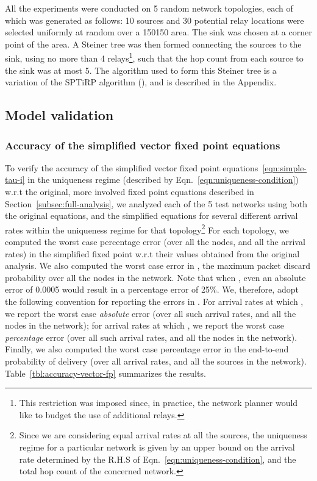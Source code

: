\documentclass[12pt, draftclsnofoot, onecolumn]{IEEEtran}
\begin{document}
All the experiments were conducted on 5 random network topologies, each of which was generated as follows: 10 sources and 30 potential relay locations were selected uniformly at random over a 150150  area. The sink was chosen at a corner point of the area. A Steiner tree was then formed connecting the sources to the sink, using no more than 4 relays\footnote{This restriction was imposed since, in practice, the network planner would like to budget the use of additional relays.}, such that the hop count from each source to the sink was at most 5. The algorithm used to form this Steiner tree is a variation of the SPTiRP algorithm (\cite{fullpaper}), and is described in the Appendix. 

\subsection{Model validation}
\subsubsection{Accuracy of the simplified vector fixed point equations}
\label{subsubsec:vector-fp-accuracy}
To verify the accuracy of the simplified vector fixed point equations~\eqref{eqn:simple-tau-i} in the uniqueness regime (described by Eqn.~\eqref{eqn:uniqueness-condition}) w.r.t the original, more involved fixed point equations described in Section~\ref{subsec:full-analysis}, we analyzed each of the 5 test networks using both the original equations, and the simplified equations for several different arrival rates within the uniqueness regime for that topology\footnote{Since we are considering equal arrival rates at all the sources, the uniqueness regime for a particular network is given by an upper bound on the arrival rate  determined by the R.H.S of Eqn.~\eqref{eqn:uniqueness-condition}, and the total hop count of the concerned network.} For each topology, we computed the worst case percentage error (over all the nodes, and all the arrival rates) in the simplified fixed point  w.r.t their values obtained from the original analysis. We also computed the worst case error in , the maximum packet discard probability over all the nodes in the network. Note that when , even an absolute error of 0.0005 would result in a percentage error of 25\%. We, therefore, adopt the following convention for reporting the errors in . For arrival rates at which , we report the worst case \emph{absolute} error (over all such arrival rates, and all the nodes in the network); for arrival rates at which , we report the worst case \emph{percentage} error (over all such arrival rates, and all the nodes in the network). Finally, we also computed the worst case percentage error in the end-to-end probability of delivery (over all arrival rates, and all the sources in the network). Table~\ref{tbl:accuracy-vector-fp} summarizes the results.
\end{document}
